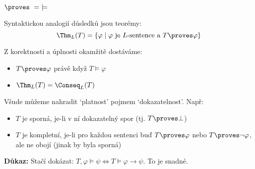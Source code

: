 \documentclass{beamer}
\begin{document}
\begin{frame}{$\proves\ =\ \models$}

    \pause
    Syntaktickou analogií \alert{důsledků} jsou \alert{teorémy}:
    $$
    \Thm_L(T)=\{\varphi\mid \varphi\text{ je $L$-sentence a } T\proves\varphi\}
    $$
    
    \pause
    Z korektnosti a úplnosti okamžitě dostáváme:
        \begin{itemize}
            \item $T\proves\varphi$ právě když $T\models\varphi$
            \item $\Thm_L(T)=\Conseq_L(T)$
        \end{itemize}
    
    \pause
    Všude můžeme nahradit `\alert{platnost}' pojmem `\alert{dokazatelnost}'.  Např:
    \begin{itemize}
        \item $T$ je \alert{sporná}, je-li v ní dokazatelný spor (tj. \alert{$T\proves\bot$})
        \item $T$ je \alert{kompletní}, je-li pro každou sentenci buď $T\proves\varphi$ nebo $T\proves\neg\varphi$, ale ne obojí (jinak by byla sporná)
    \end{itemize}

    \pause

    \pause
    \textbf{Důkaz:} Stačí dokázat: $T,\varphi\models\psi\Leftrightarrow T\models\varphi\to\psi$. To je snadné.\hfill\qedsymbol

\end{frame}
\end{document}
